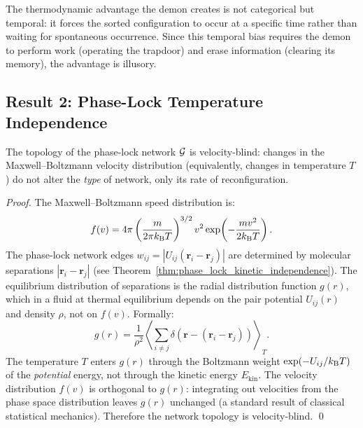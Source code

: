 \begin{corollary}
The thermodynamic advantage the demon creates is not categorical but temporal:
it forces the sorted configuration to occur at a specific time rather than
waiting for spontaneous occurrence. Since this temporal bias requires the demon
to perform work (operating the trapdoor) and erase information (clearing its
memory), the advantage is illusory.
\end{corollary}

\subsection{Result 2: Phase-Lock Temperature Independence}

\begin{theorem}
\label{thm:phase_lock_temp_independence}
The topology of the phase-lock network $\mathcal{G}$ is velocity-blind:
changes in the Maxwell--Boltzmann velocity distribution (equivalently, changes
in temperature $T$) do not alter the \emph{type} of network, only its
rate of reconfiguration.
\end{theorem}

\begin{proof}
The Maxwell--Boltzmann speed distribution is:
\begin{equation}
  f(v) = 4\pi \left(\frac{m}{2\pi k_{\mathrm{B}} T}\right)^{3/2} v^2 \exp\!\left(-\frac{mv^2}{2k_{\mathrm{B}} T}\right).
  \label{eq:maxwell_boltzmann}
\end{equation}
The phase-lock network edges $w_{ij} = |U_{ij}(\mathbf{r}_i - \mathbf{r}_j)|$
are determined by molecular separations $|\mathbf{r}_i - \mathbf{r}_j|$ (see
Theorem~\ref{thm:phase_lock_kinetic_independence}). The equilibrium distribution
of separations is the radial distribution function $g(r)$, which in a fluid
at thermal equilibrium depends on the pair potential $U_{ij}(r)$ and density $\rho$,
not on $f(v)$. Formally:
\begin{equation}
  g(r) = \frac{1}{\rho^2} \left\langle \sum_{i \neq j} \delta(\mathbf{r} - (\mathbf{r}_i - \mathbf{r}_j)) \right\rangle_T.
\end{equation}
The temperature $T$ enters $g(r)$ through the Boltzmann weight
$\exp(-U_{ij}/k_{\mathrm{B}} T)$ of the \emph{potential} energy, not through the kinetic
energy $E_{\mathrm{kin}}$. The velocity distribution $f(v)$ is orthogonal to $g(r)$:
integrating out velocities from the phase space distribution leaves $g(r)$ unchanged
(a standard result of classical statistical mechanics). Therefore the network
topology is velocity-blind. \qed
\end{proof}

